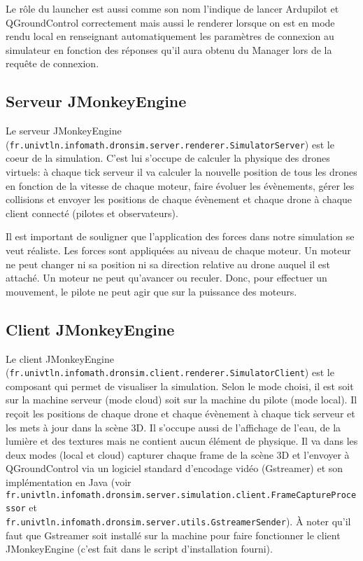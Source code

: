 \documentclass{scrartcl}
\begin{document}
Le rôle du launcher est aussi comme son nom l'indique de lancer Ardupilot et QGroundControl correctement mais aussi le renderer lorsque
on est en mode rendu local en renseignant automatiquement les paramètres de connexion au simulateur en fonction des réponses qu'il aura obtenu du Manager
lors de la requête de connexion.

\subsection{Serveur JMonkeyEngine}
Le serveur JMonkeyEngine (\texttt{fr.univtln.infomath.dronsim.server.renderer.SimulatorServer}) est le coeur de la simulation.
C'est lui s'occupe de calculer la physique des drones virtuels: à chaque tick serveur il va calculer la nouvelle position de tous les drones en fonction
de la vitesse de chaque moteur, faire évoluer les évènements, gérer les collisions et envoyer les positions de chaque évènement et chaque drone à chaque client connecté
(pilotes et observateurs).

Il est important de souligner que l’application des forces dans notre simulation se veut réaliste.
Les forces sont appliquées au niveau de chaque moteur.
Un moteur ne peut changer ni sa position ni sa direction relative au drone auquel il est attaché.
Un moteur ne peut qu'avancer ou reculer.
Donc, pour effectuer un mouvement, le pilote ne peut agir que sur la puissance des moteurs.

\subsection{Client JMonkeyEngine}
Le client JMonkeyEngine (\texttt{fr.univtln.infomath.dronsim.client.renderer.SimulatorClient}) est le composant qui permet de visualiser la simulation. Selon le mode choisi,
il est soit sur la machine serveur (mode cloud) soit sur la machine du pilote (mode local). Il reçoit les positions de chaque drone et chaque évènement à chaque tick serveur
et les mets à jour dans la scène 3D. Il s'occupe aussi de l'affichage de l'eau, de la lumière et des textures mais ne contient aucun élément de physique.
Il va dans les deux modes (local et cloud) capturer chaque frame de la scène 3D et l'envoyer à QGroundControl via un logiciel standard d'encodage vidéo
(Gstreamer) et son implémentation en Java (voir \texttt{fr.univtln.infomath.dronsim.server.simulation.client.FrameCaptureProcessor} et\\
\texttt{fr.univtln.infomath.dronsim.server.utils.GstreamerSender}). À noter qu'il faut que Gstreamer soit installé sur la machine pour
faire fonctionner le client JMonkeyEngine (c'est fait dans le script d'installation fourni).
\end{document}
